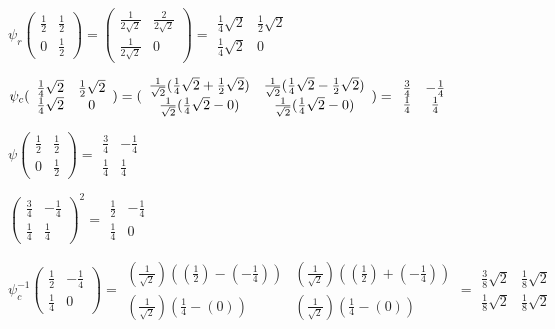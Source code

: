 \documentclass[11pt]{article}
\begin{document}
$\psi _{r}(
\begin{array}{cc}
\frac{1}{2} & \frac{1}{2} \\ 
0 & \frac{1}{2}
\end{array}
)=(
\begin{array}{cc}
\frac{1}{2\sqrt{2}} & \frac{2}{2\sqrt{2}} \\ 
\frac{1}{2\sqrt{2}} & 0
\end{array}
)=\allowbreak 
\begin{array}{cc}
\frac{1}{4}\sqrt{2} & \frac{1}{2}\sqrt{2} \\ 
\frac{1}{4}\sqrt{2} & 0
\end{array}
$

$\psi _{c}(
\begin{array}{cc}
\frac{1}{4}\sqrt{2} & \frac{1}{2}\sqrt{2} \\ 
\frac{1}{4}\sqrt{2} & 0
\end{array}
)=(
\begin{array}{cc}
\frac{1}{\sqrt{2}}(\frac{1}{4}\sqrt{2}+\frac{1}{2}\sqrt{2}) & \frac{1}{\sqrt{%
2}}(\frac{1}{4}\sqrt{2}-\frac{1}{2}\sqrt{2}) \\ 
\frac{1}{\sqrt{2}}(\frac{1}{4}\sqrt{2}-0) & \frac{1}{\sqrt{2}}(\frac{1}{4}%
\sqrt{2}-0)
\end{array}
)=\allowbreak 
\begin{array}{cc}
\frac{3}{4} & -\frac{1}{4} \\ 
\frac{1}{4} & \frac{1}{4}
\end{array}
$

$\psi ( 
\begin{array}{cc}
\frac{1}{2} & \frac{1}{2} \\ 
0 & \frac{1}{2}
\end{array}
)= 
\begin{array}{cc}
\frac{3}{4} & -\frac{1}{4} \\ 
\frac{1}{4} & \frac{1}{4}
\end{array}
$

$( 
\begin{array}{cc}
\frac{3}{4} & -\frac{1}{4} \\ 
\frac{1}{4} & \frac{1}{4}
\end{array}
)^{2}=\allowbreak 
\begin{array}{cc}
\frac{1}{2} & -\frac{1}{4} \\ 
\frac{1}{4} & 0
\end{array}
$

$\psi _{c}^{-1}(
\begin{array}{cc}
\frac{1}{2} & -\frac{1}{4} \\ 
\frac{1}{4} & 0
\end{array}
)=
\begin{array}{cc}
(\frac{1}{\sqrt{2}})((\frac{1}{2})-(-\frac{1}{4})) & (\frac{1}{\sqrt{2}})((%
\frac{1}{2})+(-\frac{1}{4})) \\ 
(\frac{1}{\sqrt{2}})(\frac{1}{4}-(0)) & (\frac{1}{\sqrt{2}})(\frac{1}{4}-(0))
\end{array}
=\allowbreak 
\begin{array}{cc}
\frac{3}{8}\sqrt{2} & \frac{1}{8}\sqrt{2} \\ 
\frac{1}{8}\sqrt{2} & \frac{1}{8}\sqrt{2}
\end{array}
$
\end{document}
